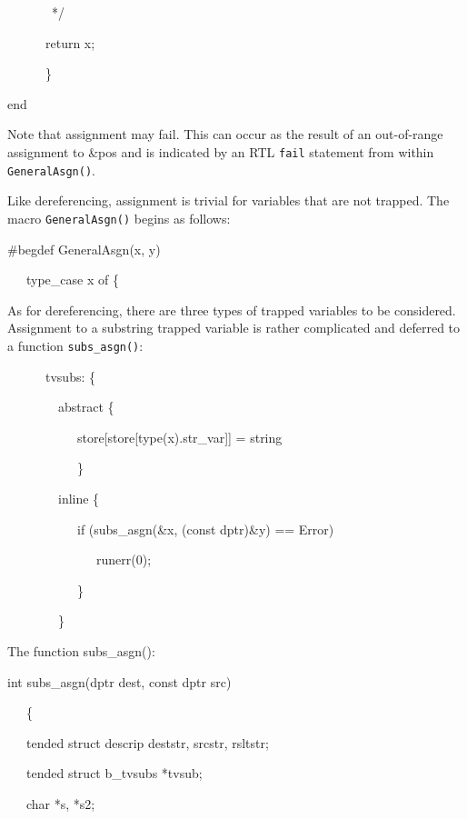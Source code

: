 {\ttfamily\mdseries
\ \ \ \ \ \ \ */}

{\ttfamily\mdseries
\ \ \ \ \ \ return x;}

{\ttfamily\mdseries
\ \ \ \ \ \ \}}

{\ttfamily\mdseries
end}

Note that assignment may fail. This can occur as the result of an
out-of-range assignment to \&pos and is indicated by an RTL
\texttt{fail} statement from within \texttt{GeneralAsgn()}.

Like dereferencing, assignment is trivial for variables that are not
trapped. The macro \texttt{GeneralAsgn()} begins as follows:

{\ttfamily\mdseries
\#begdef GeneralAsgn(x, y)}

\bigskip

{\ttfamily\mdseries
\ \ \ type\_case x of \{}


As for dereferencing, there are three types of trapped variables to be
considered. Assignment to a substring trapped variable is rather
complicated and deferred to a function \texttt{subs\_asgn()}:

{\ttfamily\mdseries
\ \ \ \ \ \ tvsubs: \{}

{\ttfamily\mdseries
\ \ \ \ \ \ \ \ abstract \{}

{\ttfamily\mdseries
\ \ \ \ \ \ \ \ \ \ \ store[store[type(x).str\_var]] = string}

{\ttfamily\mdseries
\ \ \ \ \ \ \ \ \ \ \ \}}

{\ttfamily\mdseries
\ \ \ \ \ \ \ \ inline \{}

{\ttfamily\mdseries
\ \ \ \ \ \ \ \ \ \ \ if (subs\_asgn(\&x, (const dptr)\&y) == Error)}

{\ttfamily\mdseries
\ \ \ \ \ \ \ \ \ \ \ \ \ \ runerr(0);}

{\ttfamily\mdseries
\ \ \ \ \ \ \ \ \ \ \ \}}

{\ttfamily\mdseries
\ \ \ \ \ \ \ \ \}}


The function subs\_asgn():

{\ttfamily\mdseries
int subs\_asgn(dptr dest, const dptr src)}

{\ttfamily\mdseries
\ \ \ \{}

{\ttfamily\mdseries
\ \ \ tended struct descrip deststr, srcstr, rsltstr;}

{\ttfamily\mdseries
\ \ \ tended struct b\_tvsubs *tvsub;}


\bigskip

{\ttfamily\mdseries
\ \ \ char *s, *s2;}


